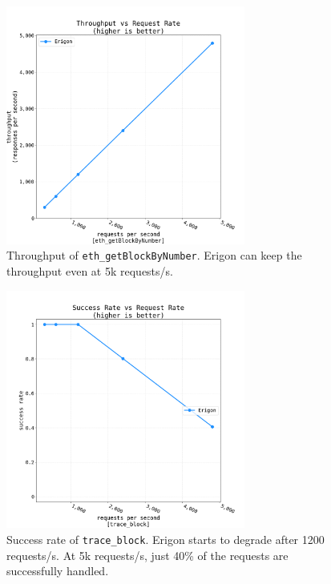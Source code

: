 \begin{figure}[H]
    \centering
    \includegraphics[width=0.7\textwidth]{Figures/results/load_tests/blocks/throughput_blocks.png}
    \caption{Throughput of {\tt eth\_getBlockByNumber}. Erigon can keep the throughput even at 5k requests/s.  }
    \label{fig:blocks-throughput}
\end{figure}

\begin{figure}[H]
    \centering
    \includegraphics[width=0.7\textwidth]{Figures/results/load_tests/traces/success_rate_trace.png}
    \caption{Success rate of {\tt trace\_block}. Erigon starts to degrade after 1200 requests/s. At 5k requests/s, just 40\% of the requests are successfully handled.  }
    \label{fig:traces-success}
\end{figure}

